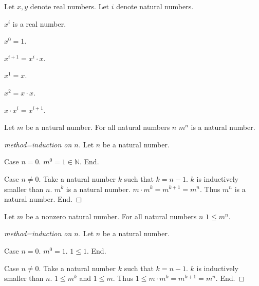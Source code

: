 \documentclass{article}
\begin{document}
\begin{forthel}
Let $x,y$ denote real numbers.
Let $i$ denote natural numbers.

\begin{signature} $x^{i}$ is a real number.
\end{signature}

\begin{axiom} $x^{0} = 1$. \end{axiom}

\begin{axiom} $x^{i+1} = x^{i} \cdot x$.
\end{axiom}

\begin{lemma}
$x^{1} = x$.
\end{lemma}

\begin{lemma}
$x^{2} = x \cdot x$.
\end{lemma}

\begin{lemma}
$x \cdot x^{i} = x^{i+1}$.
\end{lemma}

\begin{lemma}
Let $m$ be a natural number.
For all natural numbers $n$ $m^{n}$ is a natural number.
\end{lemma}
\begin{proof}[method=induction on $n$]
Let $n$ be a natural number.

Case $n = 0$. $m^{0} = 1 \in \mathbb{N}$. End.

Case $n \neq 0$. Take a natural number $k$ such that $k = n - 1$. $k$ is inductively smaller than $n$.
$m^{k}$ is a natural number. $m \cdot m^{k} = m^{k + 1} = m^{n}$. Thus $m^{n}$ is a natural number. End.
\end{proof}

\begin{lemma}
Let $m$ be a nonzero natural number.
For all natural numbers $n$ $1 \leq m^{n}$.
\end{lemma}
\begin{proof}[method=induction on $n$]
Let $n$ be a natural number.

Case $n = 0$. $m^{0} = 1$. $1 \leq 1$. End.

Case $n \neq 0$. Take a natural number $k$ such that $k = n - 1$. $k$ is inductively smaller than $n$.
$1 \leq m^{k}$ and $1 \leq m$. Thus $1 \leq m \cdot m^{k} = m^{k + 1} = m^{n}$. End.
\end{proof}

\end{forthel}
\end{document}
